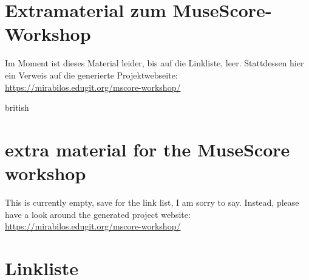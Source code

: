 \documentclass{mypubmat}%
\begin{document}




\section{Extramaterial zum MuseScore-Workshop}

Im Moment ist dieses Material leider, bis auf die Linkliste, leer.
Stattdessen hier ein Verweis auf die generierte Projektwebseite:
\url{https://mirabilos.edugit.org/mscore-workshop/}

\begin{otherlanguage*}{british}

\section{extra material for the MuseScore workshop}

This is currently empty, save for the link list, I am sorry to say.
Instead, please have a look around the generated project website:
\url{https://mirabilos.edugit.org/mscore-workshop/}

\end{otherlanguage*}

\appendix

\section{Linkliste}
%

%
\end{document}
